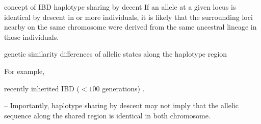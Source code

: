 concept of IBD
haplotype sharing by decent
If an allele at a given locus is identical by descent in  or more individuals, it is likely that the surrounding loci nearby on the same chromosome were derived from the same ancestral lineage in those individuals.



genetic similarity
differences of allelic states along the haplotype region


For example,
\citep{Chapman:2003jt}


%

%




recently inherited IBD (\eg $<100$ generations) \citep{Browning:2008es}.



-- Importantly, haplotype sharing by descent may not imply that the allelic sequence along the shared region is identical in both chromosome.




